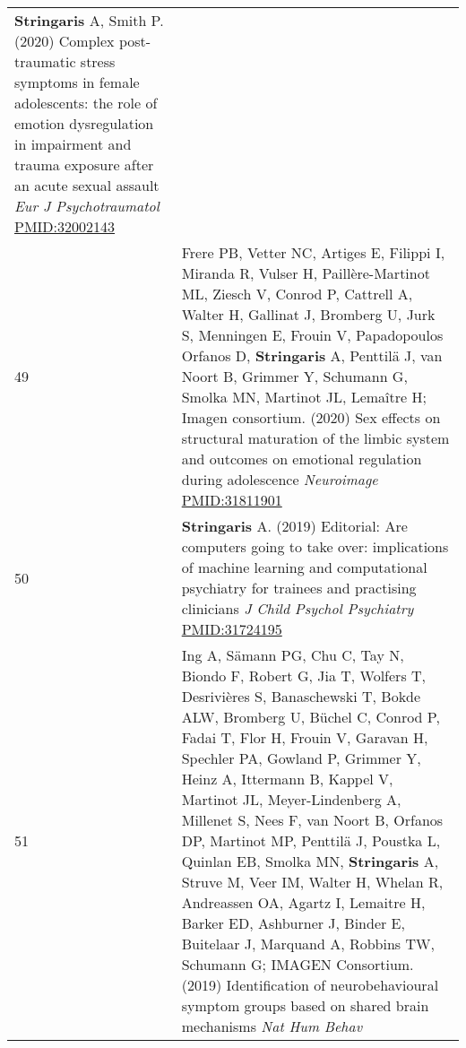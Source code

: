 \documentclass[
]{article}
\begin{document}
\begin{longtable}[]{@{}ll@{}}
\begin{minipage}[t]{0.94\columnwidth}
\textbf{Stringaris} A, Smith P. (2020) Complex post-traumatic stress
symptoms in female adolescents: the role of emotion dysregulation in
impairment and trauma exposure after an acute sexual assault \emph{Eur J
Psychotraumatol} \url{PMID:32002143}\strut
\end{minipage}\tabularnewline
\begin{minipage}[t]{0.01\columnwidth}\raggedright
49\strut
\end{minipage} & \begin{minipage}[t]{0.94\columnwidth}\raggedright
Frere PB, Vetter NC, Artiges E, Filippi I, Miranda R, Vulser H,
Paillère-Martinot ML, Ziesch V, Conrod P, Cattrell A, Walter H, Gallinat
J, Bromberg U, Jurk S, Menningen E, Frouin V, Papadopoulos Orfanos D,
\textbf{Stringaris} A, Penttilä J, van Noort B, Grimmer Y, Schumann G,
Smolka MN, Martinot JL, Lemaître H; Imagen consortium. (2020) Sex
effects on structural maturation of the limbic system and outcomes on
emotional regulation during adolescence \emph{Neuroimage}
\url{PMID:31811901}\strut
\end{minipage}\tabularnewline
\begin{minipage}[t]{0.01\columnwidth}\raggedright
50\strut
\end{minipage} & \begin{minipage}[t]{0.94\columnwidth}\raggedright
\textbf{Stringaris} A. (2019) Editorial: Are computers going to take
over: implications of machine learning and computational psychiatry for
trainees and practising clinicians \emph{J Child Psychol Psychiatry}
\url{PMID:31724195}\strut
\end{minipage}\tabularnewline
\begin{minipage}[t]{0.01\columnwidth}\raggedright
51\strut
\end{minipage} & \begin{minipage}[t]{0.94\columnwidth}\raggedright
Ing A, Sämann PG, Chu C, Tay N, Biondo F, Robert G, Jia T, Wolfers T,
Desrivières S, Banaschewski T, Bokde ALW, Bromberg U, Büchel C, Conrod
P, Fadai T, Flor H, Frouin V, Garavan H, Spechler PA, Gowland P, Grimmer
Y, Heinz A, Ittermann B, Kappel V, Martinot JL, Meyer-Lindenberg A,
Millenet S, Nees F, van Noort B, Orfanos DP, Martinot MP, Penttilä J,
Poustka L, Quinlan EB, Smolka MN, \textbf{Stringaris} A, Struve M, Veer
IM, Walter H, Whelan R, Andreassen OA, Agartz I, Lemaitre H, Barker ED,
Ashburner J, Binder E, Buitelaar J, Marquand A, Robbins TW, Schumann G;
IMAGEN Consortium. (2019) Identification of neurobehavioural symptom
groups based on shared brain mechanisms \emph{Nat Hum Behav}

\end{minipage}
\end{longtable}
\end{document}

